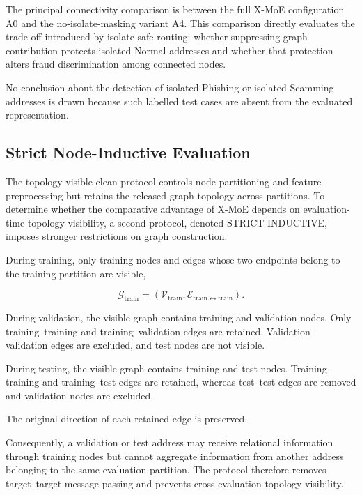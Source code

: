 \documentclass{ieeeaccess}
\begin{document}
The principal connectivity comparison is between the full X-MoE configuration A0 and the no-isolate-masking variant A4. This comparison directly evaluates the trade-off introduced by isolate-safe routing: whether suppressing graph contribution protects isolated Normal addresses and whether that protection alters fraud discrimination among connected nodes.

No conclusion about the detection of isolated Phishing or isolated Scamming addresses is drawn because such labelled test cases are absent from the evaluated representation.


\subsection{Strict Node-Inductive Evaluation}

The topology-visible clean protocol controls node partitioning and feature preprocessing but retains the released graph topology across partitions. To determine whether the comparative advantage of X-MoE depends on evaluation-time topology visibility, a second protocol, denoted STRICT-INDUCTIVE, imposes stronger restrictions on graph construction.

During training, only training nodes and edges whose two endpoints belong to the training partition are visible,

\begin{equation}
\mathcal{G}_{\mathrm{train}}
=
(
\mathcal{V}_{\mathrm{train}},
\mathcal{E}_{\mathrm{train}\leftrightarrow\mathrm{train}}
).
\end{equation}

During validation, the visible graph contains training and validation nodes. Only training--training and training--validation edges are retained. Validation--validation edges are excluded, and test nodes are not visible.

During testing, the visible graph contains training and test nodes. Training--training and training--test edges are retained, whereas test--test edges are removed and validation nodes are excluded.

The original direction of each retained edge is preserved.

Consequently, a validation or test address may receive relational information through training nodes but cannot aggregate information from another address belonging to the same evaluation partition. The protocol therefore removes target--target message passing and prevents cross-evaluation topology visibility.
\end{document}
